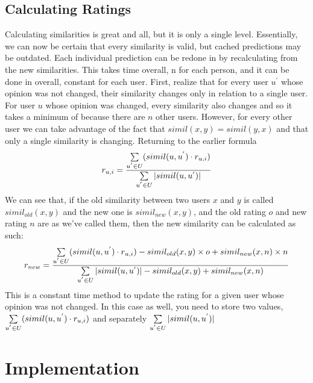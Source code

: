 \documentclass[12pt]{article}
\begin{document}
  \subsection{Calculating Ratings}
  \indent\indent Calculating similarities is great and all, but it is only a single level.  Essentially, we can now be certain that every similarity is valid, but cached predictions may be outdated.  Each individual prediction can be redone in  by recalculating from the new similarities.  This takes  time overall, n for each person, and it can be done in  overall, constant for each user.
  \p First, realize that for every user $u^{'}$ whose opinion was not changed, their similarity changes only in relation to a single user.  For user $u$ whose opinion was changed, every similarity also changes and so it takes a minimum of  because there are $n$ other users.  However, for every other user we can take advantage of the fact that $simil(x, y) = simil(y, x)$ and that only a single similarity is changing.  
  \p Returning to the earlier formula
  \begin{displaymath}
    r_{u, i} = \frac{\sum \limits_{u^{'} \in U} (simil(u, u^{'}) \cdot r_{u, i})}{\sum \limits_{u^{'} \in U} |simil(u, u^{'})|}
  \end{displaymath}
  \p We can see that, if the old similarity between two users $x$ and $y$ is called $simil_{old}(x, y)$ and the new one is $simil_{new}(x, y)$, and the old rating $o$ and new rating $n$ are as we've called them, then the new similarity can be calculated as such:
  \begin{displaymath}
    r_{new} = \frac{\sum \limits_{u^{'} \in U} (simil(u, u^{'}) \cdot r_{u, i}) - simil_{old}(x, y) \times o + simil_{new}(x, n) \times n}{\sum \limits_{u^{'} \in U} |simil(u, u^{'})| - simil_{old}(x, y) + simil_{new}(x, n)}
  \end{displaymath}
  \p This is a constant time method to update the rating for a given user whose opinion was not changed.  In this case as well, you need to store two values, $\sum \limits_{u^{'} \in U} (simil(u, u^{'}) \cdot r_{u, i})$ and separately $\sum \limits_{u^{'} \in U} |simil(u, u^{'})|$

  \pagebreak
  \section{Implementation}

 
\end{document}
